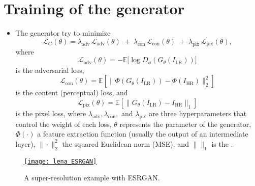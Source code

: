 \section*{Training of the generator}
\begin{itemize}
\item The generator try to minimize
\begin{equation}
\mathcal{L}_G(\theta) = 
\lambda_{\text{adv}} \, \mathcal{L}_{\text{adv}}(\theta) \;+\;
\lambda_{\text{con}} \, \mathcal{L}_{\text{con}}(\theta) \;+\;
\lambda_{\text{pix}} \, \mathcal{L}_{\text{pix}}(\theta),
\end{equation}
where
\begin{equation}
  \mathcal{L}_{\text{adv}}(\theta) = - \mathbb{E}\big[ \log D_\phi(G_\theta(I_{\text{LR}})) \big]
\end{equation}
is the adversarial loss,
\begin{equation}
\mathcal{L}_{\text{con}}(\theta) = \mathbb{E}\left[ \big\| \Phi(G_\theta(I_{\text{LR}})) - \Phi(I_{\text{HR}}) \big\|_2^2 \right]
\end{equation}
is the content (perceptual) loss, and
\begin{equation}
\mathcal{L}_{\text{pix}}(\theta) = \mathbb{E}\left[ \| G_\theta(I_{\text{LR}}) - I_{\text{HR}} \|_1 \right]
\end{equation}
is the pixel loss, where $\lambda_{\text{adv}}, \lambda_{\text{con}},$
and $\lambda_{\text{pix}}$ are three hyperparameters that control the
weight of each loss, $\theta$ represents the parameter of the
generator, $\Phi(\cdot)$ a feature extraction function (usually the
output of an intermediate layer), $\big\|\cdot\big\|_2^2$ the squared
Euclidean norm (\gls{MSE}). and $\|\|_1$ is the .

\end{itemize}

\begin{figure}[H]
  \vspace{0ex}
  \centering
  \href{https://github.com/vicente-gonzalez-ruiz/medical_imaging/blob/main/notebooks/ESRGAN.ipynb}{\texttt{[image: lena\_ESRGAN]}}
  \caption{A super-resolution example with \gls{ESRGAN}.}
  \label{fig:ESRGAN_example}
\end{figure}

